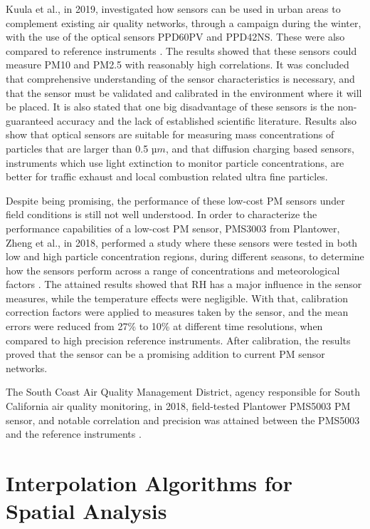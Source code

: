 Kuula et al., in 2019, investigated how sensors can be used in urban areas to complement existing air quality networks, through a campaign during the winter, with the use of the optical sensors PPD60PV and PPD42NS. These were also compared to reference instruments \cite{Kuula2019}. The results showed that these sensors could measure PM10 and PM2.5 with reasonably high correlations. It was concluded that comprehensive understanding of the sensor characteristics is necessary, and that the sensor must be validated and calibrated in the environment where it will be placed. It is also stated that one big disadvantage of these sensors is the non-guaranteed accuracy and the lack of established scientific literature. Results also show that optical sensors are suitable for measuring mass concentrations of particles that are larger than 0.5 $µm$, and that diffusion charging based sensors, instruments which use light extinction to monitor particle concentrations, are better for traffic exhaust and local combustion related ultra fine particles.

Despite being promising, the performance of these low-cost PM sensors under field conditions is still not well understood. In order to characterize the performance capabilities of a low-cost PM sensor, PMS3003 from Plantower, Zheng et al., in 2018, performed a study where these sensors were tested in both low and high particle concentration regions, during different seasons, to determine how the sensors perform across a range of concentrations and meteorological factors \cite{Zheng2018}. The attained results showed that \ac{RH} has a major influence in the sensor measures, while the temperature effects were negligible. With that, calibration correction factors were applied to measures taken by the sensor, and the mean errors were reduced from 27\% to 10\% at different time resolutions, when compared to high precision reference instruments. After calibration, the results proved that the sensor can be a promising addition to current PM sensor networks.

The South Coast Air Quality Management District, agency responsible for South California air quality monitoring, in 2018, field-tested Plantower PMS5003 PM sensor, and notable correlation and precision was attained between the PMS5003 and the reference instruments \cite{AQ-SPEC}.


\section{Interpolation Algorithms for Spatial Analysis}

